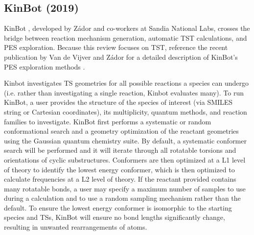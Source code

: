 \documentclass[preprint, 11pt]{elsarticle} %
\begin{document}

\subsection{KinBot (2019)}


KinBot \cite{kinbot:2018, kinbot:2019}, developed by Z\'{a}dor and co-workers at Sandia National Labs, crosses the bridge between reaction mechanism generation, automatic TST calculations, and PES exploration.
Because this review focuses on TST, reference the recent publication by Van de Vijver and Z\'{a}dor for a detailed description of KinBot's PES exploration methods \cite{kinbot:2019}.

Kinbot investigates TS geometries for all possible reactions a species can undergo (i.e. rather than investigating a single reaction, Kinbot evaluates many).
To run KinBot, a user provides the structure of the species of interest (via SMILES string or Cartesian coordinates), its multiplicity, quantum methods, and reaction families to investigate. 
KinBot first performs a systematic or random conformational search and a geometry optimization of the reactant geometries using the Gaussian quantum chemistry suite.
By default, a systematic conformer search will be performed and it will iterate through all rotatable torsions and orientations of cyclic substructures. 
Conformers are then optimized at a L1 level of theory to identify the lowest energy conformer, which is then optimized to calculate frequencies at a L2 level of theory.
If the reactant provided contains many rotatable bonds, a user may specify a maximum number of samples to use during a calculation and to use a random sampling mechanism rather than the default.
To ensure the lowest energy conformer is isomorphic to the starting species and TSs, KinBot will ensure no bond lengths significantly change, resulting in unwanted rearrangements of atoms.
\end{document}
